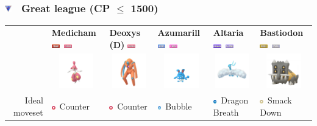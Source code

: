 \documentclass[8pt,aspectratio=169,compress]{beamer}
\renewcommand{\baselinestretch}{1.1}
\newcommand{\fightingfull}{\includegraphics[height=0.15cm]{../../images/type/full/Fighting.png}}
\newcommand{\fairyfull}{\includegraphics[height=0.15cm]{../../images/type/full/Fairy.png}}
\newcommand{\flyingfull}{\includegraphics[height=0.15cm]{../../images/type/full/Flying.png}}
\newcommand{\dragonfull}{\includegraphics[height=0.15cm]{../../images/type/full/Dragon.png}}
\newcommand{\psychicfull}{\includegraphics[height=0.15cm]{../../images/type/full/Psychic.png}}
\newcommand{\rockfull}{\includegraphics[height=0.15cm]{../../images/type/full/Rock.png}}
\newcommand{\waterfull}{\includegraphics[height=0.15cm]{../../images/type/full/Water.png}}
\newcommand{\steelfull}{\includegraphics[height=0.15cm]{../../images/type/full/Steel.png}}
\newcommand{\fightingsimp}{\includegraphics[height=0.15cm]{../../images/type/simplified/fighting.png}}
\newcommand{\dragonsimp}{\includegraphics[height=0.15cm]{../../images/type/simplified/dragon.png}}
\newcommand{\rocksimp}{\includegraphics[height=0.15cm]{../../images/type/simplified/rock.png}}
\newcommand{\watersimp}{\includegraphics[height=0.15cm]{../../images/type/simplified/water.png}}
\begin{document}
\renewcommand{\baselinestretch}{1.1}

\begin{frame}
\frametitle{\includegraphics[width=0.3cm]{../../pve/guide/great_league.png} ~Great league (CP $\leq$ 1500)}

\begin{tiny}
\begin{block}{}
\begin{center}

\begin{tabular}{rp{2cm}p{2cm}p{2cm}p{2cm}p{2cm}} 
  & \textbf{Medicham} \hfill \fightingfull~\psychicfull& \textbf{Deoxys (D)} \hfill \psychicfull & \textbf{Azumarill} \hfill\waterfull~\fairyfull &\textbf{Altaria} \hfill\dragonfull~\flyingfull &\textbf{Bastiodon} \hfill\rockfull~\steelfull  \\ 
  & \multicolumn{1}{c}{\includegraphics[width=1.5cm]{../../images/pokemon/medicham}} &  \multicolumn{1}{c}{\includegraphics[width=1.5cm]{../../images/pokemon/deoxys_d} } & \multicolumn{1}{c}{\includegraphics[width=1.5cm]{../../images/pokemon/azumarill} } & \multicolumn{1}{c}{\includegraphics[width=1.5cm]{../../images/pokemon/altaria} } & \multicolumn{1}{c}{\includegraphics[width=1.5cm]{../../images/pokemon/bastiodon} }  \\ \hline 
   \multirow{3}{*}{Ideal moveset}  & \fightingsimp~Counter & \fightingsimp~Counter & \watersimp~Bubble & \dragonsimp~Dragon Breath & \rocksimp~Smack Down \\

\end{tabular}
\end{center}
\end{block}
\end{tiny}
\end{frame}
\end{document}
